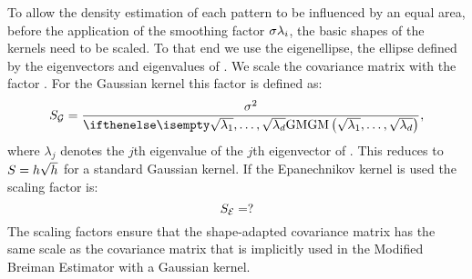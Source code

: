 	To allow the density estimation of each pattern to be influenced by an equal area, before the application of the smoothing factor $\sigma\lambda_{i}$, the basic shapes of the kernels need to be scaled. To that end we use the eigenellipse, the ellipse defined by the eigenvectors and eigenvalues of \varCovarianceFunction{\varNeighborhood{\varPattern}}. We scale the covariance matrix with the factor \varScalingFactor. For the Gaussian kernel this factor is defined as:
	\begin{equation}
		\varScalingFactor_{\varGaussian} = \frac{\varBandwidth^2}{\varGeometricMeanFunction{\sqrt{\lambda_1}, \dotsc, \sqrt{\lambda_\varDim}}},
	\end{equation}	
	where $\lambda_j$ denotes the $j$th eigenvalue of the $j$th eigenvector of \varCovarianceMatrix. 
	This reduces to $S = h\sqrt{h}$ for a standard Gaussian kernel. If the Epanechnikov kernel is used the scaling factor is:
	\begin{equation}
		S_{\mathcal{E}} = ? 
	\end{equation}
	The scaling factors ensure that the shape-adapted covariance matrix has the same scale as the covariance matrix that is implicitly used in the Modified Breiman Estimator with a Gaussian kernel.